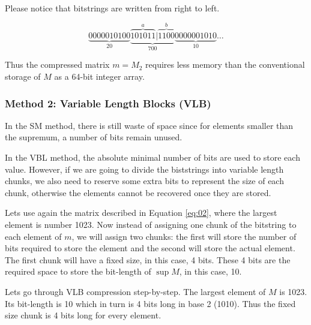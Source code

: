 \documentclass[10pt]{article}
\begin{document}
 Please notice that bitstrings are written from right to left.

\begin{equation*}\label{eq:8}
  \underbrace{0000010100}_{20}\underbrace{\overbrace{101011}^a|\overbrace{1100}^{b}}_{700}\underbrace{0000001010}_{10}\ldots
\end{equation*}

Thus the compressed matrix $m = M_2$ requires less memory than the conventional storage of $M$ as a 64-bit integer array.

\subsubsection*{Method 2: Variable Length Blocks (VLB)}

In the SM method, there is still waste of space since for elements smaller than the supremum, a number of bits remain unused.

In the VBL method, the absolute minimal number of bits are used to store each value. However, if we are going to divide the biststrings into variable length chunks, we also need to reserve some extra bits to represent the size of each chunk, otherwise the elements cannot be recovered once they are stored.

Lets use again the matrix described in Equation \ref{eq:02}, where  the largest element is number 1023. Now instead of assigning one chunk of the bitstring to each element of $m$, we will assign two chunks: the first will store the number of bits required to store the element and the second  will store the actual element. The first chunk will have a fixed size, in this case, 4 bits. These 4 bits are the required space to store the bit-length of $\sup M $, in this case, 10. 

Lets go through VLB compression step-by-step. The largest element of $M$ is 1023. Its bit-length is 10 which in turn is 4 bits long in base 2 (1010). Thus the fixed size chunk is 4 bits long for every element.
\end{document}
